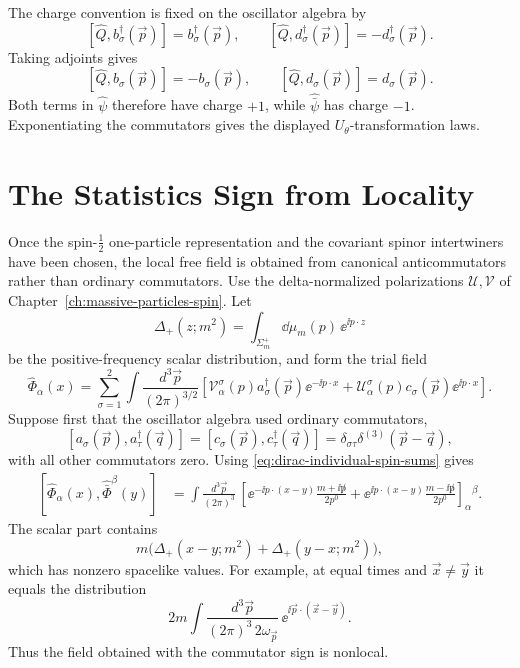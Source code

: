 The charge convention is fixed on the oscillator algebra by
\[
  [\widehat Q,b_\sigma^\dagger(\vec p)]=b_\sigma^\dagger(\vec p),
  \qquad
  [\widehat Q,d_\sigma^\dagger(\vec p)]=-d_\sigma^\dagger(\vec p).
\]
Taking adjoints gives
\[
  [\widehat Q,b_\sigma(\vec p)]=-b_\sigma(\vec p),
  \qquad
  [\widehat Q,d_\sigma(\vec p)]=d_\sigma(\vec p).
\]
Both terms in \(\widehat\psi\) therefore have charge \(+1\), while
\(\widehat{\bar\psi}\) has charge \(-1\).  Exponentiating the commutators gives
the displayed \(U_\theta\)-transformation laws.

\section{The Statistics Sign from Locality}

\begin{proposition}
\label{prop:free-dirac-locality-selects-car}
Once the spin-\(\frac12\) one-particle representation and the covariant spinor
intertwiners have been chosen, the local free field is obtained from
canonical anticommutators rather than ordinary commutators. Use the
delta-normalized polarizations \(\mathcal U,\mathcal V\) of
Chapter~\ref{ch:massive-particles-spin}. Let
\[
  \Delta_+(z;m^2)
  =
  \int_{\Sigma_m^+}\dd\mu_m(p)\,\ee^{\ii p\cdot z}
\]
be the positive-frequency scalar distribution, and form the trial field
\[
  \widehat\Phi_\alpha(x)
  =
  \sum_{\sigma=1}^2
  \int\frac{d^3\vec p}{(2\pi)^{3/2}}
  \left[
    \mathcal V_\alpha^\sigma(p)a_\sigma^\dagger(\vec p)
      \ee^{-\ii p\cdot x}
    +
    \mathcal U_\alpha^\sigma(p)c_\sigma(\vec p)
      \ee^{\ii p\cdot x}
  \right].
\]
Suppose first that the oscillator algebra used ordinary commutators,
\[
  [a_\sigma(\vec p),a_\tau^\dagger(\vec q)]
  =
  [c_\sigma(\vec p),c_\tau^\dagger(\vec q)]
  =
  \delta_{\sigma\tau}\delta^{(3)}(\vec p-\vec q),
\]
with all other commutators zero. Using
\eqref{eq:dirac-individual-spin-sums} gives
\[
\begin{aligned}
  [\widehat\Phi_\alpha(x),\widehat{\bar\Phi}^{\beta}(y)]
  &=
  \int\frac{d^3\vec p}{(2\pi)^3}\,
  \left[
    \ee^{-\ii p\cdot(x-y)}
    \frac{m+\ii\not p}{2p^0}
    +
    \ee^{\ii p\cdot(x-y)}
    \frac{m-\ii\not p}{2p^0}
  \right]_\alpha{}^\beta .
\end{aligned}
\]
The scalar part contains
\[
  m\bigl(\Delta_+(x-y;m^2)+\Delta_+(y-x;m^2)\bigr),
\]
which has nonzero spacelike values. For example, at equal times and
\(\vec x\ne\vec y\) it equals the distribution
\[
  2m\int\frac{d^3\vec p}{(2\pi)^3\,2\omega_{\vec p}}\,
  \ee^{\ii\vec p\cdot(\vec x-\vec y)} .
\]
Thus the field obtained with the commutator sign is nonlocal.


\end{proposition}
